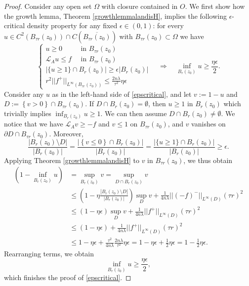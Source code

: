 \documentclass[12pt]{amsart}
\def \L {\mathcal{L}}
\def \t {\tau}
\begin{document}
\begin{proof} Consider any open set $\Omega$ with closure contained in $O$. We first show how the growth lemma, Theorem \ref{growthlemmalandisH}, implies the following $\epsilon$-critical density property for any fixed $\epsilon \in \left(0, 1 \right)$: for every $u \in C^2(B_{\t r}(z_0)) \cap C(\overline{B_{\t r}(z_0)})$ with $B_{\t r}(z_0)\subset \Omega$ we have
\begin{equation}\label{epscritical}
\begin{cases}
u\geq 0 \quad\quad\,\,\mbox{ in }B_{\t r}(z_0)\\
\L_A u \leq f  \quad\mbox{ in }B_{\t r}(z_0)\\
|\{u \geq 1 \} \cap B_{ r}(z_0)| \geq \epsilon |B_{ r}(z_0)|\\
r^2||f^+||_{L^{\infty}(B_{\t r}(z_0))} \leq \frac{2n\lambda}{\tau^2} \eta \epsilon
\end{cases}
\quad
\Longrightarrow
\quad
\inf_{B_r(z_0)} u \geq \frac{ \eta \epsilon}{2}.
\end{equation}
Consider any $u$ as in the left-hand side of \eqref{epscritical}, and let $v := 1 - u$ and $D := \left\{v > 0 \right\} \cap B_{\t r}(z_0)$. If $D\cap B_{ r}(z_0)=\emptyset$, then $u\geq 1$ in $B_{ r}(z_0)$ which trivially implies $\inf_{B_r(z_0)} u\geq 1$. We can then assume $D\cap B_{ r}(z_0)\neq \emptyset$. We notice that we have $\L_A v \geq -f$ and $v \leq 1$ on $B_{\t r}(z_0)$, and $v$ vanishes on $\partial D\cap B_{\t r}(z_0)$. Moreover,
$$
\frac{|B_r(z_0) \setminus D|}{|B_r(z_0)|}=\frac{|\left\{v \leq 0 \right\} \cap B_{r}(z_0)|}{|B_r(z_0)|}
 = \frac{|\{u \geq 1 \} \cap B_{r}(z_0)|}{|B_r(z_0)|} \geq \epsilon.
$$
Applying Theorem \ref{growthlemmalandisH} to $v$ in $B_{\t r}(z_0)$, we thus obtain
\begin{align*}
\left(1 - \inf_{B_r(z_0)} u \right)&= \sup_{B_r(z_0)} v = \sup_{D \cap B_r(z_0)} v\\
&\leq \left(1 - \eta \frac{|B_r(z_0) \setminus D|}{|B_r(z_0)|} \right) \sup_D v +
\frac{1}{4n\lambda} ||(-f)^-||_{L^{\infty}(D)} (\tau r)^2 \\
&\leq \left(1 - \eta \epsilon \right) \sup_D v +
\frac{1}{4n\lambda} ||f^+||_{L^{\infty}(D)} (\tau r)^2 \\
& \leq \left(1 - \eta \epsilon \right) +
\frac{1}{4n\lambda} ||f^+||_{L^{\infty}(D)} (\tau r)^2\\
& \leq 1 - \eta \epsilon  +
\frac{\tau^2}{4n\lambda} \frac{2n\lambda}{\tau^2} \eta \epsilon= 1 - \eta \epsilon + \frac{1}{2} \eta \epsilon=1-\frac{1}{2} \eta \epsilon.
\end{align*}
Rearranging terms, we obtain 
$$\inf_{B_r(z_0)} u  \geq \frac{ \eta \epsilon}{2},$$
which finishes the proof of \eqref{epscritical}.


\end{proof}
\end{document}
